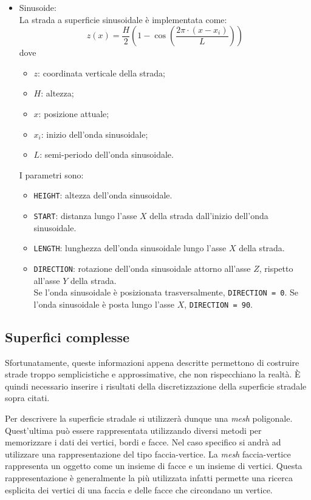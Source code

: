\begin{itemize}
\begin{pseudoc}
	{ X_road	Z_left	Z_right }
	(XZ_DATA)
	-1.0e04	0	0
	0.0500	0	0
	0.1000	0	0
	0.1500	0	0
	... ... ...
	\end{pseudoc}
	\item Sinusoide:\\
	La strada a superficie sinusoidale è implementata come:
	\begin{equation}
	z(x)=\frac{H}{2}\left( 1 - \cos \left( \frac{2\pi \cdot (x-x_i)}{L} \right)   \right) 
	\end{equation}
	dove	
	\begin{itemize}
	 	\item $z$: coordinata verticale della strada;
	 	\item $H$: altezza;
	 	\item $x$: posizione attuale;
	 	\item $x_i$: inizio dell'onda sinusoidale;
	 	\item $L$: semi-periodo dell'onda sinusoidale.
	\end{itemize}
	I parametri sono:	
	\begin{itemize}
		\item \texttt{HEIGHT}: altezza dell'onda sinusoidale.
		\item \texttt{START}: distanza lungo l'asse $X$ della strada dall'inizio dell'onda sinusoidale.
		\item \texttt{LENGTH}: lunghezza dell'onda sinusoidale lungo l'asse $X$ della strada.
		\item \texttt{DIRECTION}: rotazione dell'onda sinusoidale attorno all'asse $Z$, rispetto all'asse $Y$ della strada.\\
		Se l'onda sinusoidale è posizionata trasversalmente, \texttt{DIRECTION = 0}. Se l'onda sinusoidale è posta lungo l'asse $X$, \texttt{DIRECTION = 90}.
	\end{itemize}
\end{itemize}
%
\subsection{Superfici complesse}
Sfortunatamente, queste informazioni appena descritte permettono di costruire strade troppo semplicistiche e approssimative, che non rispecchiano la realtà. È quindi necessario inserire i risultati della discretizzazione della superficie stradale sopra citati.

Per descrivere la superficie stradale si utilizzerà dunque una \textit{mesh} poligonale. Quest'ultima può essere rappresentata utilizzando diversi metodi per memorizzare i dati dei vertici, bordi e facce. Nel caso specifico si andrà ad utilizzare una rappresentazione del tipo faccia-vertice. La \textit{mesh} faccia-vertice rappresenta un oggetto come un insieme di facce e un insieme di vertici. Questa rappresentazione è generalmente la più utilizzata infatti permette una ricerca esplicita dei vertici di una faccia e delle facce che circondano un vertice.

